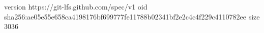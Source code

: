 version https://git-lfs.github.com/spec/v1
oid sha256:ae05e55e658ca4198176bf699777fe11788b02341bf2e2c4c4f229c4110782ee
size 3036
